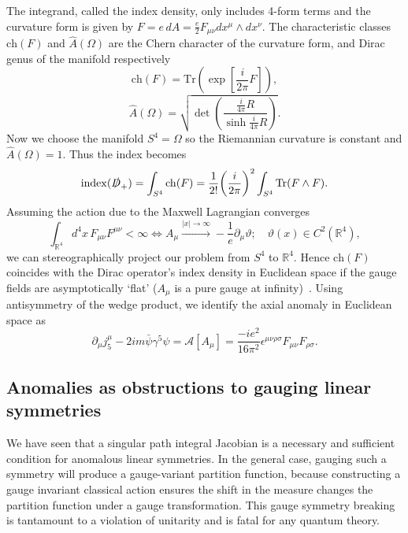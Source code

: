 \documentclass[11pt, a4paper]{article}
\begin{document}
The integrand, called the index density, only includes 4-form terms and the curvature
form is given by $F = e\,dA = \frac{e}{2}F_{\mu\nu}dx^\mu \wedge dx^\nu$.
The characteristic classes
$\mathrm{ch}(F)$ and $\hat{A}(\Omega)$ are the Chern character
of the curvature form, and Dirac genus of the manifold respectively
\begin{equation}
  \mathrm{ch}(F) = \mathrm{Tr}\left(\exp{\left[ \frac{i}{2\pi}F \right]}\right),
\end{equation}
\begin{equation}
  \hat{A}(\Omega) = \sqrt{ \det{\left( \frac{ \frac{i}{4\pi}R }{ \sinh{\frac{i}{4\pi}R} } \right) } }. 
\end{equation}
Now we choose the manifold $S^{4} = \Omega$ so the Riemannian curvature is 
constant and $\hat{A}(\Omega) = 1$. Thus the index becomes
\begin{equation}
  \mathrm{index}(\slashed{D}_+ ) =  \int_{S^4}{\mathrm{ch}(F)}
  = \frac{1}{2!}{\left(\frac{i}{2\pi}\right)}^2 \int_{S^4}{\mathrm{Tr}(F \wedge F)}.
\end{equation}
Assuming the action due to the Maxwell Lagrangian converges
\begin{equation}\label{eq:8}
  \int_{\mathbb{R}^4}{d^4x\, F_{\mu\nu}F^{\mu\nu}} < \infty \iff 
  A_\mu \xrightarrow{|x| \rightarrow \infty} - \frac{1}{e}\partial_{\mu}\vartheta;
  \quad \vartheta(x)\in C^2(\mathbb{R}^4),
\end{equation}
we can stereographically project our problem from $S^4$ to $\mathbb{R}^4$.
Hence $\mathrm{ch}(F)$ coincides with the Dirac operator's
index density in Euclidean space if the gauge fields
are asymptotically `flat' ($A_\mu$ is a pure gauge at infinity)~\cite{JackiwRebbi1977,Belavin}.
Using antisymmetry of the wedge product, we identify the
axial anomaly in Euclidean space as 
\begin{equation}
  \partial_\mu j^\mu_5 - 2im\bar{\psi}\gamma^5\psi =
  \mathcal{A}[A_\mu] = \frac{-ie^2}{16\pi^2}
  \epsilon^{\mu\nu\rho\sigma} F_{\mu\nu}F_{\rho\sigma}.
\end{equation}

\subsection{Anomalies as obstructions to gauging linear symmetries}

We have seen that a singular path integral Jacobian is a necessary and 
sufficient condition for anomalous linear symmetries.
In the general case, gauging such a symmetry will
produce a gauge-variant partition function, because constructing a gauge invariant
classical action ensures the shift in the measure changes the partition function under
a gauge transformation.
This gauge symmetry breaking is tantamount to a violation of unitarity
and is fatal for any quantum theory.
\end{document}
